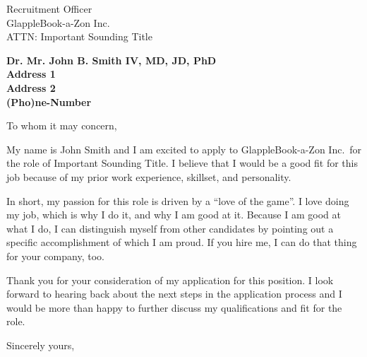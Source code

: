 \documentclass[11pt]{letter} %
\newcommand{\company}{GlappleBook-a-Zon Inc.\ }
\newcommand{\job}{Important Sounding Title}
\begin{document}

\begin{letter}{
  Recruitment Officer \\
  \company \\
  ATTN: \job
}


\begin{center}
\large\bf Dr. Mr. John B. Smith IV, MD, JD, PhD\\ %
Address 1\\
Address 2\\
(Pho)ne-Number %
\end{center}

\signature{Dr. John Smith} %


\opening{To whom it may concern,}

  My name is John Smith and I am excited to apply to \company for the role of \job.
  I believe that I would be a good fit for this job because of my prior work experience, skillset, and personality.

  In short, my passion for this role is driven by a ``love of the game''.
  I love doing my job, which is why I do it, and why I am good at it.
  Because I am good at what I do, I can distinguish myself from other candidates by pointing out a specific accomplishment of which I am proud.
  If you hire me, I can do that thing for your company, too.

  Thank you for your consideration of my application for this position.
  I look forward to hearing back about the next steps in the application process and I would be more than happy to further discuss my qualifications and fit for the role.


\closing{Sincerely yours,}


\end{letter}
\end{document}
